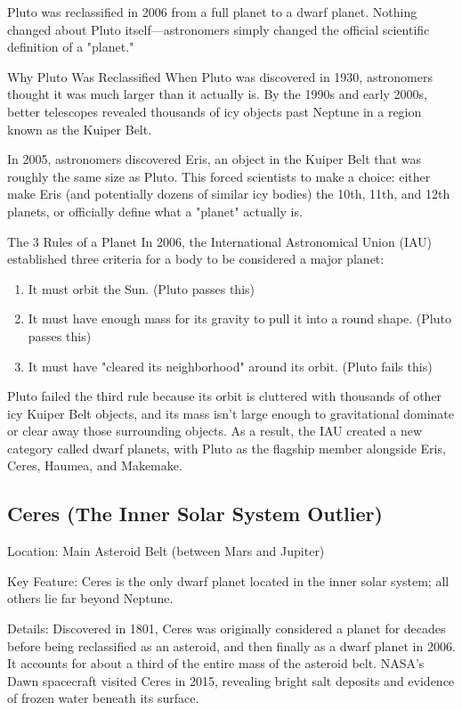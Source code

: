 Pluto was reclassified in 2006 from a full planet to a dwarf planet. Nothing changed about Pluto itself—astronomers simply changed the official scientific definition of a "planet."

Why Pluto Was Reclassified
When Pluto was discovered in 1930, astronomers thought it was much larger than it actually is. By the 1990s and early 2000s, better telescopes revealed thousands of icy objects past Neptune in a region known as the Kuiper Belt.

In 2005, astronomers discovered Eris, an object in the Kuiper Belt that was roughly the same size as Pluto. This forced scientists to make a choice: either make Eris (and potentially dozens of similar icy bodies) the 10th, 11th, and 12th planets, or officially define what a "planet" actually is.

The 3 Rules of a Planet
In 2006, the International Astronomical Union (IAU) established three criteria for a body to be considered a major planet:
\begin{enumerate}
   \item It must orbit the Sun. (Pluto passes this)
   \item It must have enough mass for its gravity to pull it into a round shape. (Pluto passes this)
   \item It must have "cleared its neighborhood" around its orbit. (Pluto fails this)
\end{enumerate}
Pluto failed the third rule because its orbit is cluttered with thousands of other icy Kuiper Belt objects, and its mass isn't large enough to gravitational dominate or clear away those surrounding objects. As a result, the IAU created a new category called dwarf planets, with Pluto as the flagship member alongside Eris, Ceres, Haumea, and Makemake.
 
 \subsection{ Ceres (The Inner Solar System Outlier)}
Location: Main Asteroid Belt (between Mars and Jupiter)

Key Feature: Ceres is the only dwarf planet located in the inner solar system; all others lie far beyond Neptune.

Details: Discovered in 1801, Ceres was originally considered a planet for decades before being reclassified as an asteroid, and then finally as a dwarf planet in 2006. It accounts for about a third of the entire mass of the asteroid belt. NASA’s Dawn spacecraft visited Ceres in 2015, revealing bright salt deposits and evidence of frozen water beneath its surface.

